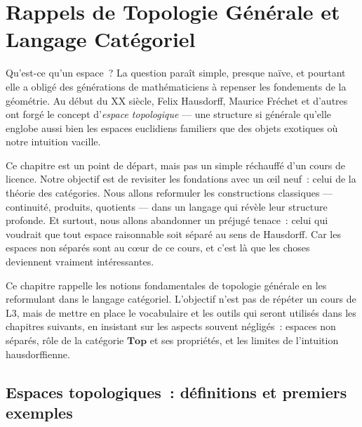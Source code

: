 \chapter{Rappels de Topologie G\'en\'erale et Langage Cat\'egoriel}
\label{ch:rappels}

Qu'est-ce qu'un espace~? La question para\^it simple, presque na\"ive, et
pourtant elle a oblig\'e des g\'en\'erations de math\'ematiciens \`a repenser les
fondements de la g\'eom\'etrie. Au d\'ebut du XX\ieme{} si\`ecle, Felix Hausdorff,
Maurice Fr\'echet et d'autres ont forg\'e le concept d'\emph{espace topologique}
--- une structure si g\'en\'erale qu'elle englobe aussi bien les espaces
euclidiens familiers que des objets exotiques o\`u notre intuition vacille.

Ce chapitre est un point de d\'epart, mais pas un simple r\'echauff\'e d'un
cours de licence. Notre objectif est de revisiter les fondations avec un
\oe il neuf~: celui de la th\'eorie des cat\'egories. Nous allons reformuler les
constructions classiques --- continuit\'e, produits, quotients --- dans un
langage qui r\'ev\`ele leur structure profonde. Et surtout, nous allons
abandonner un pr\'ejug\'e tenace~: celui qui voudrait que tout espace
\og raisonnable\fg{} soit s\'epar\'e au sens de Hausdorff. Car les espaces non
s\'epar\'es sont au c\oe ur de ce cours, et c'est l\`a que les choses
deviennent vraiment int\'eressantes.

\begin{intuition}
Ce chapitre rappelle les notions fondamentales de topologie g\'en\'erale en les reformulant
dans le langage cat\'egoriel. L'objectif n'est pas de r\'ep\'eter un cours de L3, mais de
mettre en place le vocabulaire et les outils qui seront utilis\'es dans les chapitres
suivants, en insistant sur les aspects souvent n\'eglig\'es~: espaces non s\'epar\'es, r\^ole
de la cat\'egorie $\mathbf{Top}$ et ses propri\'et\'es, et les limites de l'intuition
hausdorffienne.
\end{intuition}

\section{Espaces topologiques~: d\'efinitions et premiers exemples}


